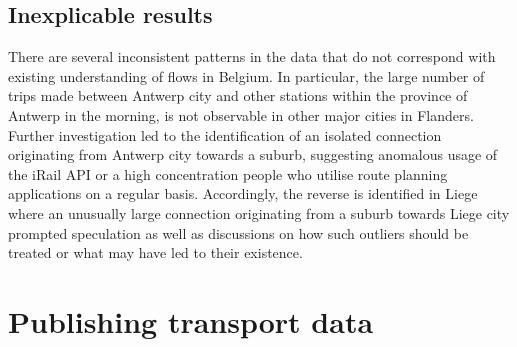 \documentclass{sig-alternate}
\begin{document}
\subsection{Inexplicable results}

There are several inconsistent patterns in the data that do not correspond with existing understanding of flows in Belgium.
In particular, the large number of trips made between Antwerp city and other stations within the province of Antwerp in the morning, is not observable in other major cities in Flanders.
Further investigation led to the identification of an isolated connection originating from Antwerp city towards a suburb, suggesting anomalous usage of the iRail API or a high concentration people who utilise route planning applications on a regular basis.
Accordingly, the reverse is identified in Liege where an unusually large connection originating from a suburb towards Liege city prompted speculation as well as discussions on how such outliers should be treated or what may have led to their existence.

\section{Publishing transport data}
\label{sec:publishing}


\end{document}
